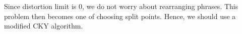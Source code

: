 \documentclass[11pt]{scrartcl}
\begin{document}
\section{}
%

Since distortion limit is 0, we do not worry about rearranging phrases. This problem then becomes one of choosing split points. Hence, we should use a modified CKY algorithm.
\end{document}
